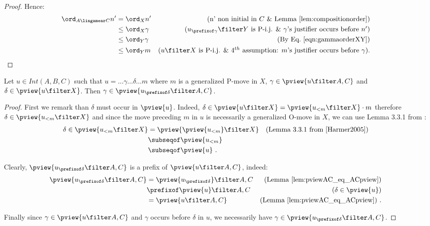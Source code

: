 \begin{proof}
Hence:
\begin{align*}
\ord_{A\lingamear C} n'
& = \ord_{X} n' & \mbox{(n' non initial in $C$ \& Lemma \ref{lem:compositionorder})} \\
& \leq \ord_{X} \gamma & \mbox{($u_{\prefixof \gamma}\filter Y$ is P-i.j. \& $\gamma$'s justifier occurs before $n'$)} \\
& \leq \ord_{Y} \gamma & \mbox{(By Eq.\ \ref{eqn:gammaorderXY})} \\
& \leq \ord_{Y} m & \mbox{($u\filter X$ is P-i.j. \&
4$^{th}$ assumption: $m$'s justifier occurs before $\gamma$)}.
\end{align*}
\end{proof}


\begin{lemma}
\label{lem:visibleatprefixofu}
Let $u\in Int(A,B,C)$ such that
$u = \ldots \gamma \ldots \delta \ldots m$
where $m$ is a generalized P-move in $X$,
$\gamma \in \pview{u\filter A,C}$  and $\delta \in \pview{u\filter X}$. Then $\gamma \in \pview{u_{\prefixof \delta} \filter A,C}$.
\end{lemma}
\begin{proof}
First we remark than $\delta$ must occur in $\pview{u}$.
Indeed, $\delta \in \pview{u\filter X} = \pview{u_{< m} \filter X} \cdot m$ therefore $\delta \in \pview{u_{< m} \filter X}$ and since the move preceding $m$ in $u$ is necessarily a generalized O-move in $X$, we can use Lemma 3.3.1 from \cite{Harmer2005}:
\begin{align*}
\delta \in \pview{u_{< m} \filter X}
&= \pview{\pview{u_{<m}}\filter X} & \mbox{(Lemma 3.3.1 from \cite{Harmer2005})}\\
&\subseqof \pview{u_{<m}} \\
&\subseqof \pview{u} \ .
\end{align*}

Clearly, $\pview{u_{\prefixof \delta} \filter A,C}$ is a prefix of $\pview{u \filter A,C}$, indeed:
\begin{align*}
\pview{u_{\prefixof \delta} \filter A,C}
& = \pview{u_{\prefixof \delta}}\filter A,C
  & \mbox{(Lemma \ref{lem:pviewAC_eq_ACpview})}  \\
& \prefixof \pview{u}\filter A,C
  & \mbox{($\delta \in \pview{u}$)} \\
& = \pview{u\filter A,C}
  & \mbox{(Lemma \ref{lem:pviewAC_eq_ACpview})} \ .
\end{align*}

Finally since $\gamma \in \pview{u\filter A,C}$ and $\gamma$ occurs before $\delta$ in $u$, we necessarily have $\gamma \in \pview{u_{\prefixof \delta}\filter A,C}$.
\end{proof}

